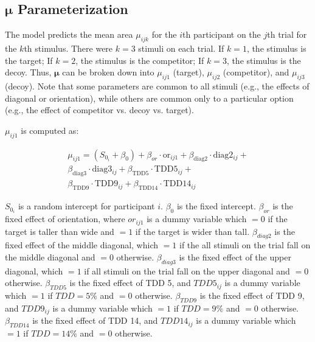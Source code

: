 \subsection{\texorpdfstring{$\boldsymbol{\mu}$}{mu} Parameterization}

The model predicts the mean area $\mu_{ijk}$ for the $i$th participant on the $j$th trial for the $k$th stimulus. There were $k=3$ stimuli on each trial. If $k=1$, the stimulus is the target; If $k=2$, the stimulus is the competitor; If $k=3$, the stimulus is the decoy. Thus, $\boldsymbol{\mu}$ can be broken down into $\mu_{ij1}$ (target), $\mu_{ij2}$ (competitor), and $\mu_{ij3}$ (decoy). Note that some parameters are common to all stimuli (e.g., the effects of diagonal or orientation), while others are common only to a particular option (e.g., the effect of competitor vs. decoy vs. target). 

$\mu_{ij1}$ is computed as:

\begin{equation}
    \begin{aligned}
        \mu_{ij1}=(S_{0_i} + \beta_{0}) + \beta_{or} \cdot \mathrm{or}_{ij1} + \beta_{\mathrm{diag}2} \cdot \mathrm{diag}2_{ij}+ \\
        \beta_{\mathrm{diag}3} \cdot \mathrm{diag}3_{ij} + \beta_{\mathrm{TDD}5} \cdot \mathrm{TDD}5_{ij} +\\ \beta_{\mathrm{TDD}9} \cdot \mathrm{TDD}9_{ij} + \beta_{\mathrm{TDD}14} \cdot \mathrm{TDD}14_{ij}
        \label{circle_mu_eqn1}
    \end{aligned}
\end{equation}

$S_{0_i}$ is a random intercept for participant $i$. $\beta_{0}$ is the fixed intercept. $\beta_{or}$ is the fixed effect of orientation, where $or_{ij1}$ is a dummy variable which $=0$ if the target is taller than wide and $=1$ if the target is wider than tall. $\beta_{diag2}$ is the fixed effect of the middle diagonal, which $=1$ if the all stimuli on the trial fall on the middle diagonal and $=0$ otherwise. $\beta_{diag3}$ is the fixed effect of the upper diagonal, which $=1$ if all stimuli on the trial fall on the upper diagonal and $=0$ otherwise. $\beta_{TDD5}$ is the fixed effect of TDD 5, and $TDD5_{ij}$ is a dummy variable which $=1$ if $TDD=5\%$ and $=0$ otherwise. $\beta_{TDD9}$ is the fixed effect of TDD 9, and $TDD9_{ij}$ is a dummy variable which $=1$ if $TDD=9\%$ and $=0$ otherwise. $\beta_{TDD14}$ is the fixed effect of TDD 14, and $TDD14_{ij}$ is a dummy variable which $=1$ if $TDD=14\%$ and $=0$ otherwise. 

